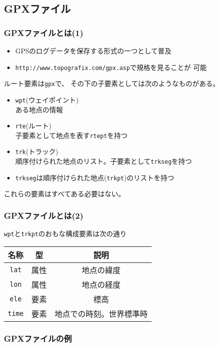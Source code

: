 \subsection{GPXファイル}
  \begin{frame}[containsverbatim]
   \frametitle{GPXファイルとは(1)}
   \begin{itemize}
    \item GPSのログデータを保存する形式の一つとして普及
    \item \texttt{http://www.topografix.com/gpx.asp}で規格を見ることが
可能
   \end{itemize}
 ルート要素は\texttt{gpx}で、
 その下の子要素としては次のようなものがある。
\begin{itemize}
 \item \texttt{wpt}(ウェイポイント)\\
			 ある地点の情報
 \item \texttt{rte}(ルート)\\
			 子要素として地点を表す\texttt{rtept}を持つ
 \item \texttt{trk}(トラック)\\
			 順序付けられた地点のリスト。子要素として\texttt{trkseg}を持つ
 \item \texttt{trkseg}は順序付けられた地点(\texttt{trkpt})のリストを持つ
\end{itemize}
 これらの要素はすべてある必要はない。
 \end{frame}
\begin{frame}[containsverbatim]
\frametitle{GPXファイルとは(2)}
 \texttt{wpt}と\texttt{trkpt}のおもな構成要素は次の通り
\begin{center}
	 \begin{tabular}{|c|c|c|}\hline
		名称&型&\multicolumn{1}{c|}{説明}\\\hline
		\texttt{lat}&属性 & 地点の緯度\\ \hline
		\texttt{lon}&属性 & 地点の経度\\ \hline
		\texttt{ele}&要素 &標高 \\ \hline
		\texttt{time}&要素 &地点での時刻。世界標準時 \\ \hline
 \end{tabular}
\end{center}
\end{frame}
\begin{frame}[containsverbatim]
\frametitle{GPXファイルの例}
\end{frame}
